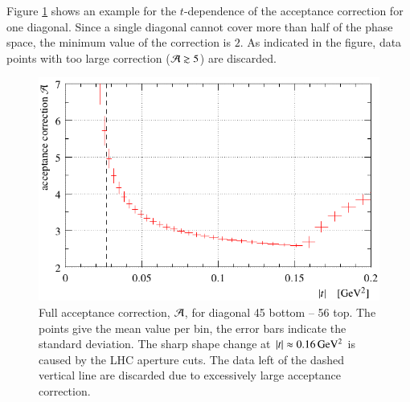 Figure \ref{fig:acceptance result} shows an example for the $t$-dependence of the acceptance correction for one diagonal. Since a single diagonal cannot cover more than half of the phase space, the minimum value of the correction is $2$. As indicated in the figure, data points with too large correction (${\cal A} \gtrsim 5$) are discarded.

\begin{figure}
\begin{center}
\includegraphics{fig/acc_corr_hists.pdf}
\vskip-3mm
\caption{%
Full acceptance correction, ${\cal A}$, for diagonal 45 bottom -- 56 top. The points give the mean value per bin, the error bars indicate the standard deviation. The sharp shape change at $|t|\approx 0.16\,{\rm GeV^2}$ is caused by the LHC aperture cuts. The data left of the dashed vertical line are discarded due to excessively large acceptance correction.
}
\label{fig:acceptance result}
\end{center}
\end{figure}


